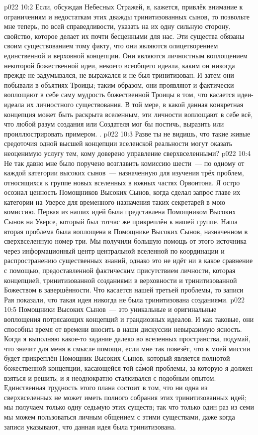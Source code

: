 \vs p022 10:2 \pc Если, обсуждая Небесных Стражей, я, кажется, привлёк внимание к ограничениям и недостаткам этих дважды тринитизованных сынов, то позвольте мне теперь, по всей справедливости, указать на их одну сильную сторону, свойство, которое делает их почти бесценными для нас. Эти существа обязаны своим существованием тому факту, что они являются олицетворением единственной и верховной концепции. Они являются личностным воплощением некоторой божественной идеи, некоего всеобщего идеала, каким он никогда прежде не задумывался, не выражался и не был тринитизован. И затем они побывали в объятиях Троицы; таким образом, они проявляют и фактически воплощают в себе саму мудрость божественной Троицы в том, что касается идеи\hyp{}идеала их личностного существования. В той мере, в какой данная конкретная концепция может быть раскрыта вселенным, эти личности воплощают в себе всё, что любой разум создания или Создателя мог бы постичь, выразить или проиллюстрировать примером. .
\vs p022 10:3 Разве ты не видишь, что такие живые средоточия одной высшей концепции вселенской реальности могут оказать неоценимую услугу тем, кому доверено управление сверхвселенными?
\vs p022 10:4 \pc Не так давно мне было поручено возглавить комиссию шести~--- по одному от каждой категории высоких сынов~--- назначенную для изучения трёх проблем, относящихся к группе новых вселенных в южных частях Орвонтона. Я остро осознал ценность Помощников Высоких Сынов, когда сделал запрос главе их категории на Уверсе для временного назначения таких секретарей в мою комиссию. Первая из наших идей была представлена Помощником Высоких Сынов на Уверсе, который был тотчас же прикреплён к нашей группе. Наша вторая проблема была воплощена в Помощнике Высоких Сынов, назначенном в сверхвселенную номер три. Мы получили большую помощь от этого источника через информационный центр центральной вселенной по координации и распространению существенных знаний, однако это не идёт ни в какое сравнение с помощью, предоставленной фактическим присутствием личности, которая  концепцией, тринитизованной созданиями в верховности и тринитизованной Божеством в завершённости. Что касается нашей третьей проблемы, то записи Рая показали, что такая идея никогда не была тринитизована созданиями.
\vs p022 10:5 \pc Помощники Высоких Сынов~--- это уникальные и оригинальные воплощения потрясающих концепций и грандиозных идеалов. И как таковые, они способны время от времени вносить в наши дискуссии невыразимую ясность. Когда я выполняю какое\hyp{}то задание далеко во вселенных пространства, подумай, что значит для меня в смысле помощи, если мне так повезёт, что к моей миссии будет прикреплён Помощник Высоких Сынов, который является полнотой божественной концепции, касающейся той с\'амой проблемы, за которую я должен взяться и решить; и я неоднократно сталкивался с подобным опытом. Единственная трудность этого плана состоит в том, что ни одна из сверхвселенных не может иметь полного собрания этих тринитизованных идей; мы получаем только одну седьмую этих существ; так что только один раз из семи мы можем пользоваться личным общением с этими существами, даже когда записи указывают, что данная идея была тринитизована.
